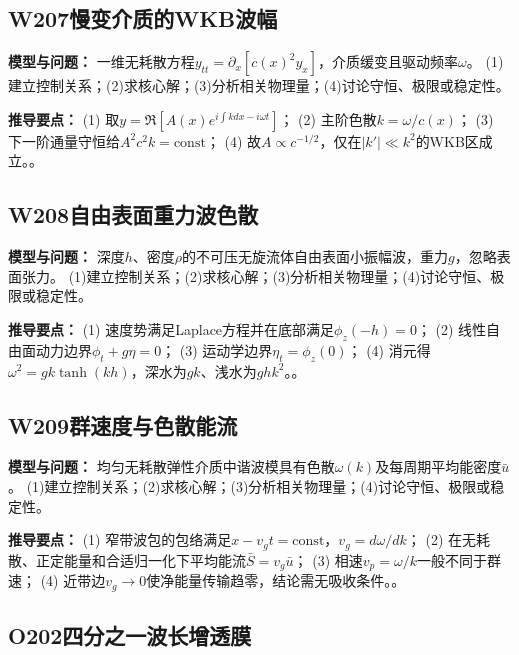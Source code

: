 \subsection*{W207\quad 慢变介质的WKB波幅}

\textbf{模型与问题：} 一维无耗散方程$y_{tt}=\partial_x[c(x)^2y_x]$，介质缓变且驱动频率$\omega$。 (1)建立控制关系；(2)求核心解；(3)分析相关物理量；(4)讨论守恒、极限或稳定性。

\par\textbf{推导要点：} (1) 取$y=\Re[A(x)e^{i\int kdx-i\omega t}]$； (2) 主阶色散$k=\omega/c(x)$； (3) 下一阶通量守恒给$A^2c^2k=\mathrm{const}$； (4) 故$A\propto c^{-1/2}$，仅在$|k'|\ll k^2$的WKB区成立。。

\par\medskip

\subsection*{W208\quad 自由表面重力波色散}

\textbf{模型与问题：} 深度$h$、密度$\rho$的不可压无旋流体自由表面小振幅波，重力$g$，忽略表面张力。 (1)建立控制关系；(2)求核心解；(3)分析相关物理量；(4)讨论守恒、极限或稳定性。

\par\textbf{推导要点：} (1) 速度势满足Laplace方程并在底部满足$\phi_z(-h)=0$； (2) 线性自由面动力边界$\phi_t+g\eta=0$； (3) 运动学边界$\eta_t=\phi_z(0)$； (4) 消元得$\omega^2=gk\tanh(kh)$，深水为$gk$、浅水为$ghk^2$。。

\par\medskip

\subsection*{W209\quad 群速度与色散能流}

\textbf{模型与问题：} 均匀无耗散弹性介质中谐波模具有色散$\omega(k)$及每周期平均能密度$\bar u$。 (1)建立控制关系；(2)求核心解；(3)分析相关物理量；(4)讨论守恒、极限或稳定性。

\par\textbf{推导要点：} (1) 窄带波包的包络满足$x-v_gt=\mathrm{const}$，$v_g=d\omega/dk$； (2) 在无耗散、正定能量和合适归一化下平均能流$\bar S=v_g\bar u$； (3) 相速$v_p=\omega/k$一般不同于群速； (4) 近带边$v_g\to0$使净能量传输趋零，结论需无吸收条件。。

\par\medskip

\subsection*{O202\quad 四分之一波长增透膜}

